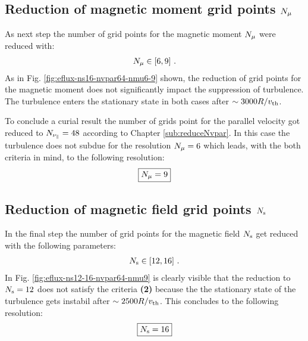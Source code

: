 \subsection{Reduction of magnetic moment grid points $N_\mu$}
\label{sub:reduceNmu}

As next step the number of grid points for the magnetic moment $N_\mu$ were reduced with:
\begin{gather*}
	N_\mu \in [6, 9] ~.
\end{gather*}
As in Fig. \ref{fig:eflux-ns16-nvpar64-nmu6-9} shown, the reduction of grid points for the magnetic moment does not significantly impact the suppression of turbulence. The turbulence enters the stationary state in both cases after $\sim 3000 R/v_{\mathrm{th}}$.  


To conclude a curial result the number of grids point for the parallel velocity got reduced to $N_{\nu_\parallel} = 48$ according to Chapter \ref{sub:reduceNvpar}. In this case the turbulence does not subdue for the resolution $N_\mu = 6$ which leads, with the both criteria in mind, to the following resolution:
\begin{gather*}
	\boxed{N_\mu = 9}
\end{gather*}


\subsection{Reduction of magnetic field grid points $N_\mathrm{s}$}
\label{sub:reduceNs}

In the final step the number of grid points for the magnetic field $N_\mathrm{s}$ get reduced with the following parameters:
\begin{gather*}
	N_\mathrm{s} \in [12, 16]~.
\end{gather*}
In Fig. \ref{fig:eflux-ns12-16-nvpar64-nmu9} is clearly visible that the reduction to $N_\mathrm{s} = 12$ does not satisfy the criteria \textbf{(2)} because the the stationary state of the turbulence gets instabil after $\sim 2500 R/v_{\mathrm{th}}$. This concludes to the following resolution:
\begin{gather*}
	\boxed{N_\mathrm{s} = 16}
\end{gather*}

